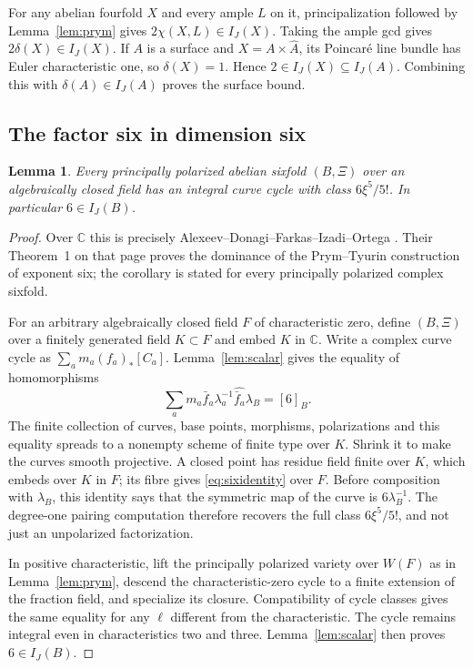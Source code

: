 \documentclass[11pt]{article}
\newcommand{\C}{\mathbb C}
\newtheorem{lemma}[theorem]{Lemma}
\theoremstyle{definition}
\theoremstyle{remark}
\begin{document}
For any abelian fourfold $X$ and every ample $L$ on it, principalization followed by Lemma~\ref{lem:prym} gives $2\chi(X,L)\in I_J(X)$. Taking the ample gcd gives $2\delta(X)\in I_J(X)$. If $A$ is a surface and $X=A\times\widehat A$, its Poincar\'e line bundle has Euler characteristic one, so $\delta(X)=1$. Hence $2\in I_J(X)\subseteq I_J(A)$. Combining this with $\delta(A)\in I_J(A)$ proves the surface bound.

\subsection{The factor six in dimension six}

\begin{lemma}\label{lem:six}
Every principally polarized abelian sixfold $(B,\Xi)$ over an algebraically closed field has an integral curve cycle with class $6\xi^5/5!$. In particular $6\in I_J(B)$.
\end{lemma}
\begin{proof}
Over $\C$ this is precisely Alexeev--Donagi--Farkas--Izadi--Ortega \cite[Corollary~2, p.~165]{ADFIO}. Their Theorem~1 on that page proves the dominance of the Prym--Tyurin construction of exponent six; the corollary is stated for every principally polarized complex sixfold.

For an arbitrary algebraically closed field $F$ of characteristic zero, define $(B,\Xi)$ over a finitely generated field $K\subset F$ and embed $K$ in $\C$. Write a complex curve cycle as $\sum_am_a(f_a)_*[C_a]$. Lemma~\ref{lem:scalar} gives the equality of homomorphisms
\begin{equation}\label{eq:sixidentity}
          \sum_am_a\bar f_a\lambda_a^{-1}\widehat{\bar f_a}\lambda_B=[6]_B.
\end{equation}
The finite collection of curves, base points, morphisms, polarizations and this equality spreads to a nonempty scheme of finite type over $K$. Shrink it to make the curves smooth projective. A closed point has residue field finite over $K$, which embeds over $K$ in $F$; its fibre gives \eqref{eq:sixidentity} over $F$. Before composition with $\lambda_B$, this identity says that the symmetric map of the curve is $6\lambda_B^{-1}$. The degree-one pairing computation therefore recovers the full class $6\xi^5/5!$, and not just an unpolarized factorization.

In positive characteristic, lift the principally polarized variety over $W(F)$ as in Lemma~\ref{lem:prym}, descend the characteristic-zero cycle to a finite extension of the fraction field, and specialize its closure. Compatibility of cycle classes gives the same equality for any $\ell$ different from the characteristic. The cycle remains integral even in characteristics two and three. Lemma~\ref{lem:scalar} then proves $6\in I_J(B)$.
\end{proof}
\end{document}
